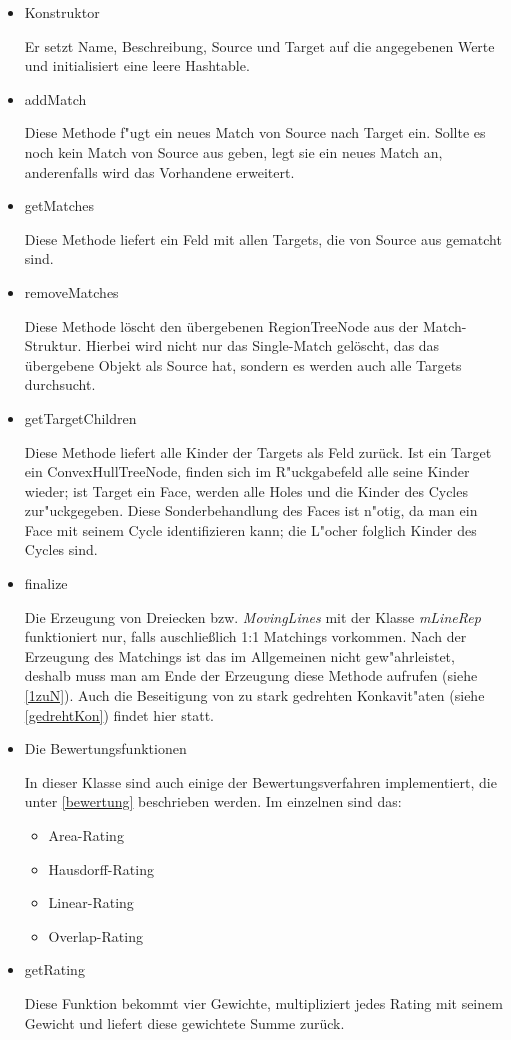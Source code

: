 \begin{itemize}

\item Konstruktor

Er setzt Name, Beschreibung, Source und Target auf die angegebenen Werte und initialisiert eine leere Hashtable.

\item addMatch

Diese Methode f"ugt ein neues Match von Source nach Target ein. Sollte es noch kein Match von Source aus geben, legt sie ein neues Match an, anderenfalls wird  das Vorhandene erweitert.

\item getMatches

Diese Methode liefert ein Feld mit allen Targets, die von Source aus gematcht sind.

\item removeMatches

Diese Methode löscht den übergebenen RegionTreeNode aus der Match-Struktur. Hierbei wird nicht nur das Single-Match gelöscht, das das übergebene Objekt als Source hat, sondern es werden auch alle Targets durchsucht.

\item getTargetChildren

Diese Methode liefert alle Kinder der Targets als Feld zurück. Ist ein Target ein ConvexHullTreeNode, finden sich im R"uckgabefeld alle seine Kinder  wieder; ist Target ein Face, werden alle Holes und die Kinder des Cycles zur"uckgegeben. Diese Sonderbehandlung des Faces ist n"otig, da man ein Face mit seinem Cycle identifizieren kann; die L"ocher folglich Kinder des Cycles sind.

\item finalize

Die Erzeugung von Dreiecken bzw. \textit{MovingLines} mit der Klasse \textit{mLineRep} funktioniert nur, falls auschließlich 1:1 Matchings vorkommen. Nach der Erzeugung des Matchings ist das im Allgemeinen nicht gew"ahrleistet, deshalb muss man am Ende der Erzeugung diese Methode aufrufen  (siehe \vref{1zuN}). Auch die Beseitigung von zu stark gedrehten Konkavit"aten (siehe \vref{gedrehtKon}) findet hier statt.

\item Die Bewertungsfunktionen

In dieser Klasse sind auch einige der Bewertungsverfahren implementiert, die unter \vref{bewertung} beschrieben werden. Im einzelnen sind das:
\begin{itemize}
\item  Area-Rating
\item  Hausdorff-Rating
\item  Linear-Rating
\item  Overlap-Rating
\end{itemize}

\item getRating

Diese Funktion bekommt vier Gewichte, multipliziert jedes Rating mit seinem Gewicht und liefert diese gewichtete Summe zurück.

\end{itemize}


